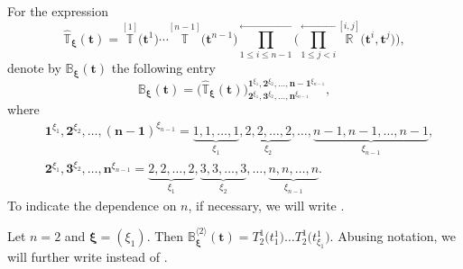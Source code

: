\documentclass[10pt,a4paper]{amsart}
\numberwithin{equation}{section}
\newcommand\ltwo{\langle 2\rangle}
\begin{document}
For the expression
\begin{equation}\label{betthe 1}
\widehat{\mathbb{T}}_{\boldsymbol{\xi}}(\boldsymbol{t})= \overset{[1]}{\mathbb{T}}\bigl(\boldsymbol{t}^1\bigr)\cdots \overset{[n-1]}{\mathbb{T}}\bigl(\boldsymbol{t}^{n-1}\bigr)\overset{\leftarrow}{\prod\limits_{1\leq i\leq n-1}}\Biggl(\overset{\leftarrow}{\prod\limits_{1\leq j< i}}\overset{[i,j]}{\mathbb{R}}\bigl(\boldsymbol{t}^i,\boldsymbol{t}^j\bigr)\Biggr),
\end{equation}
denote by ${\mathbb{B}}_{\boldsymbol{\xi}}(\boldsymbol{t})$ the following entry
\begin{equation*}
{\mathbb{B}}_{\boldsymbol{\xi}}(\boldsymbol{t})=\bigl( \widehat{\mathbb{T}}_{\boldsymbol{\xi}}(\boldsymbol{t}) \bigr)^{\boldsymbol{1}^{\xi_1}, \boldsymbol{2}^{\xi_2}, \dots, \boldsymbol{n-1}^{\xi_{n-1}}}_{\boldsymbol{2}^{\xi_1}, \boldsymbol{3}^{\xi_2}, \dots, \boldsymbol{n}^{\xi_{n-1}}},
\end{equation*}
where
\begin{align*}
&\boldsymbol{1}^{\xi_1}, \boldsymbol{2}^{\xi_2}, \dots, \boldsymbol{(n-1)}^{\xi_{n-1}} =\underbrace{ 1, 1,\dots, 1}_{\xi_1}, \underbrace{ 2,2,\dots,2}_{\xi_2}, \dots,\underbrace{n-1, n-1, \dots, n-1}_{\xi_{n-1}},\\
&\boldsymbol{2}^{\xi_1}, \boldsymbol{3}^{\xi_2}, \dots, \boldsymbol{n}^{\xi_{n-1}} =\underbrace{ 2, 2,\dots, 2}_{\xi_1}, \underbrace{ 3,3,\dots,3}_{\xi_2}, \dots, \underbrace{n, n, \dots, n}_{\xi_{n-1}}.
\end{align*}
To indicate the dependence on $n$, if necessary, we will write .
\begin{Example}
Let $n=2$ and $\boldsymbol{\xi}=(\xi_{1}) $. Then ${\mathbb{B}}_{\boldsymbol{\xi}}^{\ltwo}(\boldsymbol{t})=T^1_{2} \bigl(t_{1}^{1} \bigr) \dots T^1_{2} \bigl(t_{\xi_1^{}}^{1}\bigr)$.
Abusing notation, we will further write \smash{${\mathbb{B}}_{\xi_1}^{\ltwo}(\boldsymbol{t})$}
instead of \smash{${\mathbb{B}}_{\boldsymbol{\xi}}^{\ltwo}(\boldsymbol{t})$}.
\end{Example}
\end{document}
